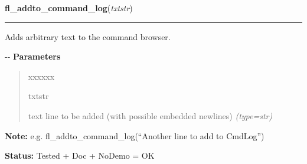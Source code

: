     \vspace{0.5ex}

\hspace{.8\funcindent}\begin{boxedminipage}{\funcwidth}

    \raggedright \textbf{fl\_addto\_command\_log}(\textit{txtstr})

    \vspace{-1.5ex}

    \rule{\textwidth}{0.5\fboxrule}
\setlength{\parskip}{2ex}

Adds arbitrary text to the command browser.

-{}-
\setlength{\parskip}{1ex}
      \textbf{Parameters}
      \vspace{-1ex}

      \begin{quote}
        \begin{Ventry}{xxxxxx}

          \item[txtstr]


text line to be added (with possible embedded newlines)
            {\it (type=str)}

        \end{Ventry}

      \end{quote}

\textbf{Note:} 
e.g. fl\_addto\_command\_log(``Another line to add to CmdLog'')


\textbf{Status:} 
Tested + Doc + NoDemo = OK


    \end{boxedminipage}

    \label{xformslib:flgoodies:fl_set_command_log_position}

    \vspace{0.5ex}

